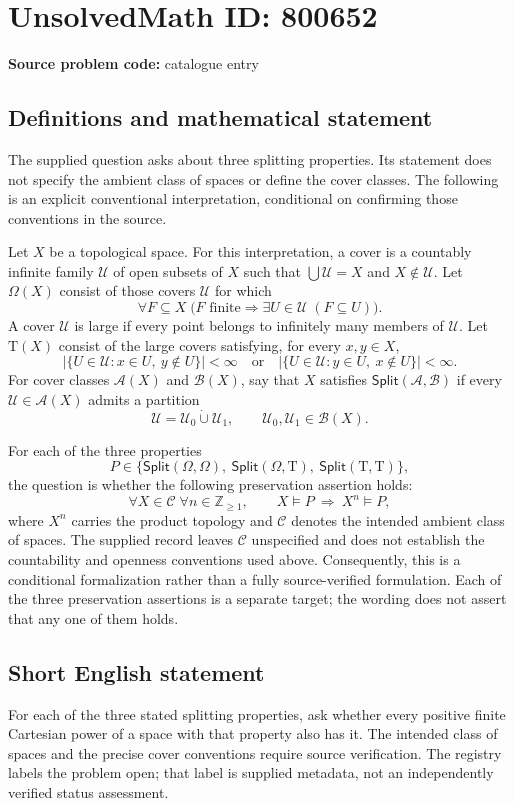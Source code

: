 \documentclass[11pt]{article}
\begin{document}
\section*{UnsolvedMath ID: 800652}
\textbf{Source problem code:} catalogue entry
\subsection{Definitions and mathematical statement}
The supplied question asks about three splitting properties. Its statement does not specify the ambient class of spaces or define the cover classes. The following is an explicit conventional interpretation, conditional on confirming those conventions in the source.

Let \(X\) be a topological space. For this interpretation, a cover is a countably infinite family \(\mathcal U\) of open subsets of \(X\) such that \(\bigcup\mathcal U=X\) and \(X\notin\mathcal U\). Let \(\Omega(X)\) consist of those covers \(\mathcal U\) for which
\[
\forall F\subseteq X\;\bigl(F\text{ finite}\Longrightarrow \exists U\in\mathcal U\;(F\subseteq U)\bigr).
\]
A cover \(\mathcal U\) is large if every point belongs to infinitely many members of \(\mathcal U\). Let \(\mathrm T(X)\) consist of the large covers satisfying, for every \(x,y\in X\),
\[
\bigl|\{U\in\mathcal U:x\in U,\ y\notin U\}\bigr|<\infty
\quad\text{or}\quad
\bigl|\{U\in\mathcal U:y\in U,\ x\notin U\}\bigr|<\infty.
\]
For cover classes \(\mathcal A(X)\) and \(\mathcal B(X)\), say that \(X\) satisfies \(\mathsf{Split}(\mathcal A,\mathcal B)\) if every \(\mathcal U\in\mathcal A(X)\) admits a partition
\[
\mathcal U=\mathcal U_0\mathbin{\dot\cup}\mathcal U_1,
\qquad \mathcal U_0,\mathcal U_1\in\mathcal B(X).
\]

For each of the three properties
\[
P\in\{\mathsf{Split}(\Omega,\Omega),\ \mathsf{Split}(\Omega,\mathrm T),\ \mathsf{Split}(\mathrm T,\mathrm T)\},
\]
the question is whether the following preservation assertion holds:
\[
\forall X\in\mathcal C\;\forall n\in\mathbb Z_{\geq 1},
\qquad X\models P\ \Longrightarrow\ X^n\models P,
\]
where \(X^n\) carries the product topology and \(\mathcal C\) denotes the intended ambient class of spaces. The supplied record leaves \(\mathcal C\) unspecified and does not establish the countability and openness conventions used above. Consequently, this is a conditional formalization rather than a fully source-verified formulation. Each of the three preservation assertions is a separate target; the wording does not assert that any one of them holds.
\subsection{Short English statement}
For each of the three stated splitting properties, ask whether every positive finite Cartesian power of a space with that property also has it. The intended class of spaces and the precise cover conventions require source verification. The registry labels the problem open; that label is supplied metadata, not an independently verified status assessment.
\end{document}

